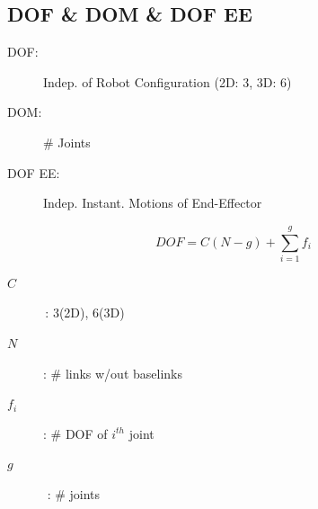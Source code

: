 \subsection{DOF \& DOM \& DOF EE}
    \begin{description}
        \item[DOF:] Indep. of Robot Configuration (2D: 3, 3D: 6)
        \item[DOM:] \# Joints
        \item[DOF EE:] Indep. Instant. Motions of End-Effector
    \end{description}
        \vspace{0.5em}
        $$
            DOF = C (N-g) + \sum_{i=1}^g f_i
        $$
        \begin{minipage}{0.55\linewidth}
            \begin{description}
                \item[$C$]\,: 3(2D), 6(3D)
                \item[$N$]: \# links w/out baselinks
            \end{description}
        \end{minipage}
        \begin{minipage}{0.44\linewidth}
            \begin{description}
                \item[$f_i$]: \# DOF of $i^{th}$ joint 
                \item[$g$]\,\,: \# joints   
            \end{description}
        \end{minipage}

